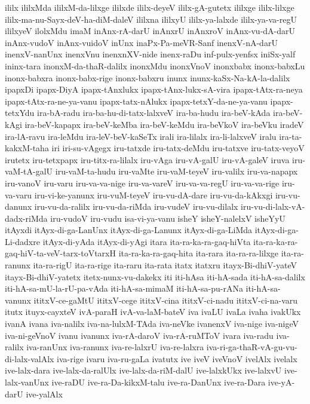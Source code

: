 {ililx
ililxMda
ililxM-da-lilxge
ililxde
ililx-deyeV
ililx-gA-gutetx
ililxge
ililx-lilxge
ililx-ma-nu-Sayx-deV-ha-diM-daleV
ililxna
ililxyU
ililx-ya-lalxde
ililx-ya-va-regU
ililxyeV
ilolxMdu
imaM
inAnx-rA-darU
inAnxrU
inAnxroV
inAnx-vu-dA-darU
inAnx-vudoV
inAnx-vuidoV
inUnx
inaPx-Pa-meVR-Sanf
inenxV-nA-darU
inenxV-nanUnx
inenxVnu
inenxnXV-nide
inenx-raDu
inf-pulx-yenfsx
iniSx-yalf
ininx-tara
inonxM-da-thaR-dalilx
inonxMdu
inonxVnoV
inonxbabx
inonx-babxLu
inonx-babxra
inonx-babx-rige
inonx-babxru
inunx
inunx-kaSx-Na-kA-la-dalilx
ipapxDi
ipapx-DiyA
ipapx-tAnxlukx
ipapx-tAnx-lukx-sA-vira
ipapx-tAtx-ra-neya
ipapx-tAtx-ra-ne-ya-vanu
ipapx-tatx-nAlukx
ipapx-tetxY-da-ne-ya-vanu
ipapx-tetxYdu
ira-bA-radu
ira-ba-hu-di-tatx-lalxveV
ira-ba-hudu
ira-beV-kAda
ira-beV-kAgi
ira-beV-kapapx
ira-beV-keMba
ira-beV-keMdu
ira-beVkoV
ira-beVku
iradeV
ira-lA-ravu
ira-leMdu
ira-leV-beV-kaSeTx
irali
ira-lilalx
ira-li-lalxveV
iralu
ira-ta-kakxM-taha
iri
iri-su-vAgegx
iru-tatxde
iru-tatx-deMdu
iru-tatxve
iru-tatx-veyoV
irutetx
iru-tetxpapx
iru-titx-ra-lilalx
iru-vAga
iru-vA-galU
iru-vA-galeV
iruva
iru-vaM-tA-galU
iru-vaM-ta-hudu
iru-vaMte
iru-vaM-teyeV
iru-valilx
iru-va-napapx
iru-vanoV
iru-varu
iru-va-va-nige
iru-va-vareV
iru-va-va-regU
iru-va-va-rige
iru-va-varu
iru-vi-ke-yanunx
iru-vuM-teyeV
iru-vu-dA-dare
iru-vu-da-kAkxgi
iru-vu-danunx
iru-vu-da-ralilx
iru-vu-da-riMda
iru-vudeV
iru-vu-dilalx
iru-vu-di-lalx-vA-dadx-riMda
iru-vudoV
iru-vudu
isa-vi-ya-vanu
isheY
isheY-nalelxV
isheYyU
itAyxdi
itAyx-di-ga-LanUnx
itAyx-di-ga-Lanunx
itAyx-di-ga-LiMda
itAyx-di-ga-Li-dadxre
itAyx-di-yAda
itAyx-di-yAgi
itara
ita-ra-ka-ra-gaq-hiVta
ita-ra-ka-ra-gaq-hiV-ta-veV-tarx-toVtarxH
ita-ra-ka-ra-gaq-hita
ita-rara
ita-ra-ra-lilxge
ita-ra-ranunx
ita-ra-rigU
ita-ra-rige
ita-raru
ita-rata
itatx
itatxru
itayx-Bi-dhiV-yateV
itayx-Bi-dhiV-yatetx
itetx-nunx-vu-dakekx
iti
iti-hAsa
iti-hA-sada
iti-hA-sa-dalilx
iti-hA-sa-mU-la-rU-pa-vAda
iti-hA-sa-mimaM
iti-hA-sa-pu-rANa
iti-hA-sa-vanunx
ititxV-ce-gaMtU
ititxV-cege
ititxV-cina
ititxV-ci-nadu
ititxV-ci-na-varu
itutx
ituyx-cayxteV
ivA-paraH
ivA-va-laM-bateV
iva
ivaLU
ivaLa
ivaha
ivakUkx
ivanA
ivana
iva-nalilx
iva-na-lulxM-TAda
iva-neVke
ivanenxV
iva-nige
iva-nigeV
iva-ni-geVnoV
ivanu
ivanunx
iva-rA-daroV
iva-rA-ruMToV
ivara
iva-radu
iva-ralilx
iva-ranUnx
iva-ranunx
iva-re-lalxrU
iva-re-lalxra
iva-ri-ga-thaR-vA-gu-vu-di-lalx-valAlx
iva-rige
ivaru
iva-ru-gaLa
ivatutx
ive
iveV
iveVnoV
ivelAlx
ivelalx
ive-lalx-dara
ive-lalx-da-ralUlx
ive-lalx-da-riM-dalU
ive-lalxkUkx
ive-lalxvU
ive-lalx-vanUnx
ive-raDU
ive-ra-Da-kikxM-talu
ive-ra-DanUnx
ive-ra-Dara
ive-yA-darU
ive-yalAlx
}
